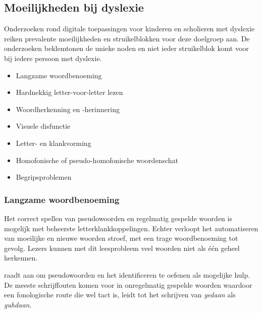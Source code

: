 




\subsection{Moeilijkheden bij dyslexie}

Onderzoeken rond digitale toepassingen voor kinderen en scholieren met dyslexie reiken prevalente moeilijkheden en struikelblokken voor deze doelgroep aan. De onderzoeken beklemtonen de unieke noden en niet ieder struikelblok komt voor bij iedere persoon met dyslexie.

\begin{itemize}
	\item Langzame woordbenoeming
	\item Hardnekkig letter-voor-letter lezen
	\item Woordherkenning en -herinnering
	\item Visuele disfunctie
	\item Letter- en klankvorming
	\item Homofonische of pseudo-homofonische woordenschat
	\item Begripsproblemen
\end{itemize}

\subsubsection{Langzame woordbenoeming}

Het correct spellen van pseudowoorden en regelmatig gespelde woorden is mogelijk met beheerste letterklankkoppelingen. Echter verloopt het automatiseren van moeilijke en nieuwe woorden stroef, met een trage woordbenoeming tot gevolg. Lezers kunnen met dit leesprobleem veel woorden niet als één geheel herkennen. 

\textcite{Filipak2020} raadt aan om pseudowoorden en het identificeren te oefenen als mogelijke hulp. De meeste schrijffouten komen voor in onregelmatig gespelde woorden waardoor een fonologische route die wel tact is, leidt tot het schrijven van \textit{gedaan} als \textit{guhdaan}.

